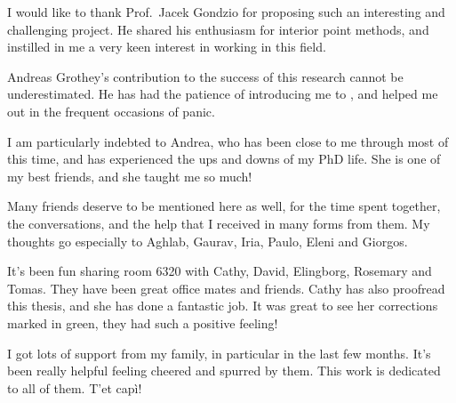 
%
%

I would like to thank Prof.~Jacek Gondzio for proposing such an
interesting and challenging project. 
He shared his enthusiasm for interior point methods, and 
instilled in me a very keen interest in working in this field.

Andreas Grothey's contribution to the success of this research
cannot be underestimated. 
He has had the patience of introducing me to \OOPS, and helped me out
in the frequent occasions of panic.

I am particularly indebted to Andrea, who has been close to me through
most of this time, and has experienced the ups and downs of my PhD life.
She is one of my best friends, and she taught me so much!

Many friends deserve to be mentioned here as well, for the time spent together,
the conversations, and the help that I received in many forms from them.
My thoughts go especially to Aghlab, Gaurav, Iria, Paulo, Eleni and Giorgos. 

It's been fun sharing room 6320 with Cathy, David, Elingborg, Rosemary
and Tomas. They have been great office mates and
friends.
Cathy has also proofread this thesis, and she has done a fantastic job. 
It was great to see her corrections marked in green, they had such a 
positive feeling!

I got lots of support from my family, in particular in the last few months.
It's been really helpful feeling cheered and spurred by them.
This work is dedicated to all of them. T'et cap\`i!
